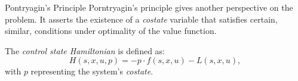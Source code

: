 \documentclass[10pt, compress]{beamer}
\begin{document}
\begin{frame}{Pontryagin's Principle}
    Porntryagin's principle gives another perspective on the problem. It asserts the existence of a \textit{costate} variable that satisfies certain, similar, conditions under optimality of the value function.

    The \textit{control state Hamiltonian} is defined as:
    \begin{equation*}
        H(s, x, u, p) = - p \cdot f(s, x, u) - L(s, x, u),
    \end{equation*}
    with \(p\) representing the system's \textit{costate}.
\end{frame}
\end{document}
